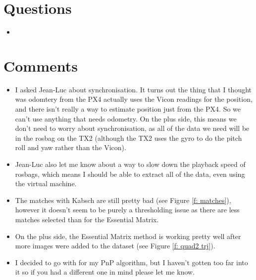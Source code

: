 \documentclass[12pt,a4paper]{article}
\begin{document}
\section{Questions}
\begin{itemize}
\item 
\end{itemize}

\section{Comments}
\begin{itemize}
\item I asked Jean-Luc about synchronisation. It turns out the thing that I thought was odomtery from the PX4 actually uses the Vicon readings for the position, and there isn't really a way to estimate position just from the PX4. So we can't use anything that needs odometry. On the plus side, this means we don't need to worry about synchronisation, as all of the data we need will be in the rosbag on the TX2 (although the TX2 uses the gyro to do the pitch roll and yaw rather than the Vicon).
\item Jean-Luc also let me know about a way to slow down the playback speed of rosbags, which means I should be able to extract all of the data, even using the virtual machine.
\item The matches with Kabsch are still pretty bad (see Figure \ref{f: matches}), however it doesn't seem to be purely a thresholding issue as there are less matches selected than for the Essential Matrix.
\item On the plus side, the Essential Matrix method is working pretty well after more images were added to the dataset (see Figure \ref{f: quad2 trj}).
\item I decided to go with \citep{li2012robust} for my PnP algorithm, but I haven't gotten too far into it so if you had a different one in mind please let me know.
\end{itemize}

\end{document}
